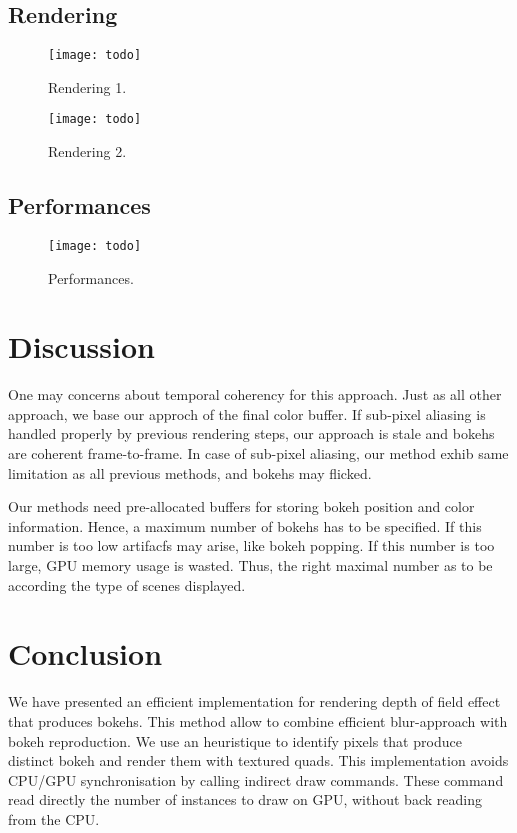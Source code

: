 \subsection{Rendering}
	\begin{figure}[htb]\centering
	\texttt{[image: todo]}
	\caption{Rendering 1.}
	\label{YourName:fig1}
	\end{figure}

	\begin{figure}[htb]\centering
	\texttt{[image: todo]}
	\caption{Rendering 2.}
	\label{YourName:fig1}
	\end{figure}

\subsection{Performances}
	\begin{figure}[htb]\centering
	\texttt{[image: todo]}
	\caption{Performances.}
	\label{YourName:fig1}
	\end{figure}

\section{Discussion}
One may concerns about temporal coherency for this approach. Just as all other approach, we base our approch of the final color buffer. If sub-pixel aliasing is handled properly by previous rendering steps, our approach is stale and bokehs are coherent frame-to-frame. In case of sub-pixel aliasing, our method exhib same limitation as all previous methods, and bokehs may flicked.

Our methods need pre-allocated buffers for storing bokeh position and color information. Hence, a maximum number of bokehs has to be specified. If this number is too low artifacfs may arise, like bokeh popping. If this number is too large, GPU memory usage is wasted. Thus, the right maximal number as to be according the type of scenes displayed.

\section{Conclusion}
We have presented an efficient implementation for rendering depth of field effect that produces bokehs. This method allow to combine efficient blur-approach with bokeh reproduction. We use an heuristique to identify pixels that produce distinct bokeh and render them with textured quads. This implementation avoids CPU/GPU synchronisation by calling indirect draw commands. These command read directly the number of instances to draw on GPU, without back reading from the CPU.


